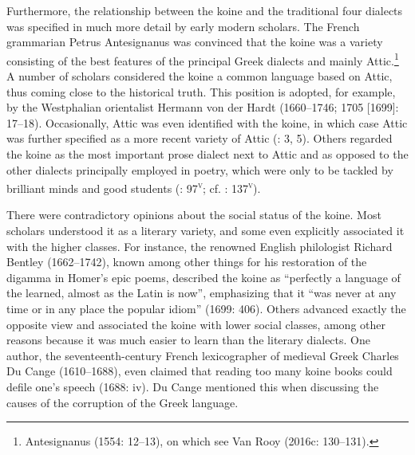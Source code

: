 Furthermore, the relationship between the koine and the traditional four dialects was specified in much more detail by early modern scholars. The French grammarian Petrus Antesignanus was convinced that the koine was a variety consisting of the best features of the principal Greek dialects and mainly Attic.\footnote{Antesignanus (1554: 12–13), on which see Van Rooy (2016c: 130–131).} A number of scholars considered the koine a common language based on Attic, thus coming close to the historical truth. This position is adopted, for example, by the Westphalian orientalist Hermann von der Hardt (1660–1746; 1705 [1699]: 17–18). Occasionally, Attic was even identified with the koine, in which case Attic was further specified as a more recent variety of Attic (\citealt{Georgi1733}: 3, 5). Others regarded the koine as the most important prose dialect next to Attic and as opposed to the other dialects principally employed in poetry, which were only to be tackled by brilliant minds and good students (\citealt{Vives1531}: 97\textsc{\textsuperscript{v}}; cf. \citealt{Vuidius1569}: 137\textsc{\textsuperscript{v}}).

There were contradictory opinions about the social status of the koine. Most scholars understood it as a literary variety, and some even explicitly associated it with the higher classes. For instance, the renowned English philologist Richard Bentley (1662–1742), known among other things for his restoration of the digamma in Homer’s epic poems, described the koine as “perfectly a language of the learned, almost as the Latin is now”, emphasizing that it “was never at any time or in any place the popular idiom” (1699: 406). Others advanced exactly the opposite view and associated the koine with lower social classes, among other reasons because it was much easier to learn than the literary dialects. One author, the seventeenth-century French lexicographer of medieval Greek Charles Du Cange (1610–1688), even claimed that reading too many koine books could defile one’s speech (1688: iv). Du Cange mentioned this when discussing the causes of the corruption of the Greek language.

